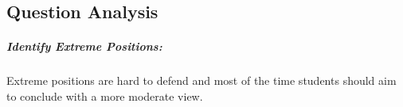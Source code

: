 \documentclass[../../main]{subfiles}
\begin{document}
\subsection{Question Analysis}

\subparagraph{Identify Extreme Positions:} Extreme positions are hard to defend and most of the time students should aim to conclude with a more moderate view. 
\end{document}
